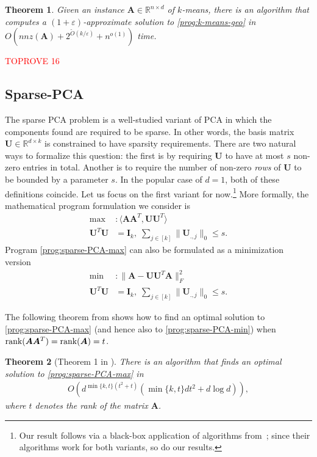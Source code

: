 \documentclass[11pt]{article}
\makeatletter
\theoremstyle{plain}
\newtheorem{theorem}{Theorem}[section]
\theoremstyle{plain}
\theoremstyle{definition}
\theoremstyle{plain}
\theoremstyle{remark}
\newenvironment{proof}[1][\protect\proofname]{\par
	\normalfont\topsep6\p@\@plus6\p@\relax
	\trivlist
	\itemindent\parindent
	\item[\hskip\labelsep\scshape #1]\ignorespaces
}{\endtrivlist\@endpefalse
}
\providecommand{\proofname}{Proof}
\newcommand{\RR}{\mathbb{R}}
\makeatother
\begin{document}
\begin{theorem}
    \label{thm:k-means-runtime}
    Given an instance $\bm{A}\in \RR^{n\times d}$ of $k$-means, there is an algorithm that computes a $(1+\varepsilon)$-approximate solution to \ref{prog:k-means-geo} in $O(nnz(\bm{A})+ 2^{\widetilde{O}(k/\varepsilon)}+n^{o(1)})$ time. 
\end{theorem}
\begin{proof}\textcolor{red}{TOPROVE 16}\end{proof}

\subsection{Sparse-PCA \cite{del2022sparse}}
The sparse PCA problem is a well-studied variant of PCA in which the components found are required to be sparse. In other words, the basis matrix $\bm{U}\in \RR^{d\times k}$ is constrained to have sparsity requirements. There are two natural ways to formalize this question: the first is by requiring $\bm{U}$ to have at most $s$ non-zero entries in total. Another is to require the number of non-zero {\em rows} of $\bm{U}$ to be bounded by a parameter $s$. In the popular case of $d=1$, both of these definitions coincide. Let us focus on the first variant for now.\footnote{Our result follows via a black-box application of algorithms from~\cite{del2022sparse}; since their algorithms work for both variants, so do our results.} More formally, the mathematical program formulation we consider is
\begin{align}
    \label{prog:sparse-PCA-max} \max&: \langle \bm{A}\bm{A}^T, \bm{U}\bm{U}^T \rangle \tag{sparse-PCA-max}\\
    \bm{U}^T\bm{U}&=\bm{I}_k, \; \sum_{j\in [k]}\|\bm{U}_{.,j}\|_0 \leq s.
\end{align}
Program \ref{prog:sparse-PCA-max} can also be formulated as a minimization version 
\begin{align}
    \label{prog:sparse-PCA-min} \min&: \|\bm{A}-\bm{U}\bm{U}^T\bm{A}\|_F^2 \tag{sparse-PCA-min}\\
    \bm{U}^T\bm{U}&=\bm{I}_k, \; \sum_{j\in [k]}\|\bm{U}_{.,j}\|_0 \leq s.
\end{align}

The following theorem from \cite{del2022sparse} shows how to find an optimal solution to \ref{prog:sparse-PCA-max} (and hence also to \ref{prog:sparse-PCA-min}) when $\textnormal{rank}(\bm{A}\bm{A}^T)=\textnormal{rank}(\bm{A})=t$.
\begin{theorem}[Theorem 1 in \cite{del2022sparse}]
\label{thm:sparsepca}
    There is an algorithm that finds an optimal solution to \ref{prog:sparse-PCA-max} in 
    \begin{align}
        O\left(d^{\min\{k,t\}(t^2+t)}\left(\min\{k,t\}dt^2+ d\log d\right)\right),
    \end{align}
    where $t$ denotes the rank of the matrix $\bm{A}$.
\end{theorem}
\end{document}
